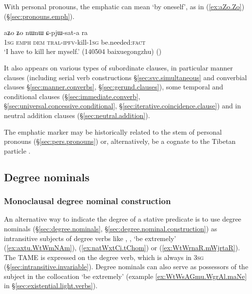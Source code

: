 With personal pronouns, the emphatic  can mean `by oneself', as in (\ref{ex:aZo.Zo}) (§\ref{sec:pronouns.emph}).

\begin{exe}
\ex \label{ex:aZo.Zo}
\gll aʑo ʑo nɯnɯ ɕ-pjɯ-sat-a ra \\
\textsc{1sg} \textsc{emph} \textsc{dem} \textsc{tral}-\textsc{ipfv}-kill-\textsc{1sg} be.needed:\textsc{fact} \\
\glt `I have to kill her myself.' (140504 baixuegongzhu)
()
\end{exe}

It also appears on various types of subordinate clauses, in particular manner clauses (including serial verb constructions §\ref{sec:svc.simultaneous} and converbial clauses §\ref{sec:manner.converbs}, §\ref{sec:gerund.clauses}), some temporal and conditional clauses (§\ref{sec:immediate.converb}, §\ref{sec:universal.concessive.conditional}, §\ref{sec:iterative.coincidence.clause}) and in neutral addition clauses  (§\ref{sec:neutral.addition}).

The emphatic marker may be historically related to the  stem of personal pronouns (§\ref{sec:pers.pronouns}) or, alternatively, be a cognate to the Tibetan particle .

\subsection{Degree nominals} \label{sec:degree.nominal.subject}

\subsubsection{Monoclausal degree nominal construction} \label{sec:degree.monoclausal}
An alternative way to indicate the degree of a stative predicate is to use degree nominals (§\ref{sec:degree.nominals}, §\ref{sec:degree.nominal.construction}) as intransitive subjects of degree verbs like , , `be extremely' (\ref{ex:axtu.WtWmNAm}),  (\ref{ex:natWxtCi.tChom}) or  (\ref{ex:WtWrnaR.mWjrtaR}). The TAME is expressed on the degree verb, which is always in \textsc{3sg} (§\ref{sec:intransitive.invariable}). Degree nominals can also serve as possessors of the subject   in the collocation  `be extremely' (example \ref{ex:WtWsAGmu.WgrAl.maNe} in §\ref{sec:existential.light.verbs}). 

